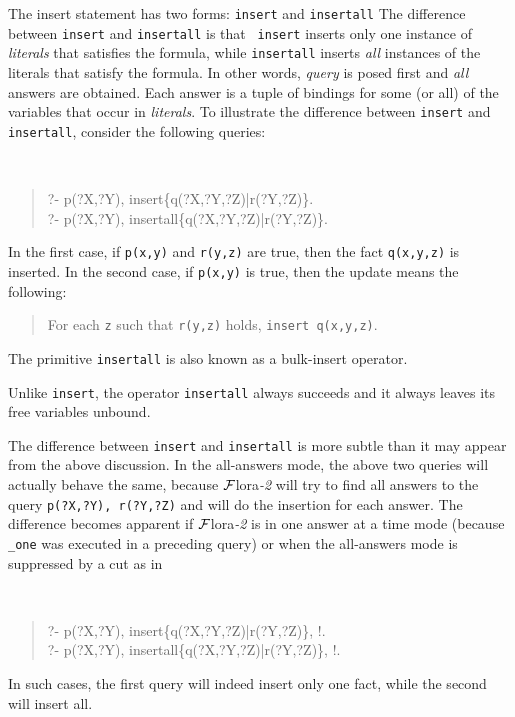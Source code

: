 \documentclass[11pt]{article}
\newcommand{\FLORA}{{\mbox{\sc ${\cal F}${lora}\rm\emph{-2}}}\xspace}
\begin{document}
The insert statement has two forms: {\tt insert} and {\tt insertall}
The difference between {\tt insert} and {\tt insertall} is that {\tt
  insert} inserts only one instance of \emph{literals} that satisfies the
formula, while {\tt insertall} inserts \emph{all} instances of the literals
that satisfy the formula. In other words, \emph{query} is posed first and
\emph{all} answers are obtained. Each answer is a tuple of bindings for
some (or all) of the variables that occur in \emph{literals}.  To
illustrate the difference between {\tt insert} and {\tt insertall},
consider the following queries:
{\tt
\begin{quote}
      ?- p(?X,?Y), insert\{q(?X,?Y,?Z)|r(?Y,?Z)\}.\\
      ?- p(?X,?Y), insertall\{q(?X,?Y,?Z)|r(?Y,?Z)\}.
\end{quote}
}
In the first case, if {\tt p(x,y)} and {\tt r(y,z)} are true, then the
fact {\tt q(x,y,z)} is inserted. In the second case, if {\tt p(x,y)} is
true, then the update means the following:
\begin{quote}
  For each {\tt z} such that {\tt r(y,z)} holds, {\tt insert q(x,y,z)}.
\end{quote}
The primitive {\tt insertall} is also known as a bulk-insert operator.

Unlike {\tt insert}, the operator {\tt insertall} always succeeds and it
always leaves its free variables unbound.

The difference between {\tt insert} and {\tt insertall} is more subtle than
it may appear from the above discussion. In the all-answers mode, the above
two queries will actually behave the same, because \FLORA will try to find
all answers to the query {\tt p(?X,?Y), r(?Y,?Z)} and will do the 
insertion for each answer. The difference becomes apparent if \FLORA is in
one answer at a time mode (because {\tt \_one} was executed in a preceding
query) or when the all-answers mode is suppressed by a cut as in
{\tt
\begin{quote}
       ?- p(?X,?Y), insert\{q(?X,?Y,?Z)|r(?Y,?Z)\}, !.\\ 
       ?- p(?X,?Y), insertall\{q(?X,?Y,?Z)|r(?Y,?Z)\}, !.
\end{quote}
}
\noindent
In such cases, the first query will indeed insert only one fact, while the
second will insert all.
\end{document}
